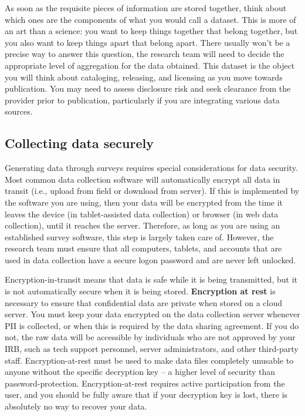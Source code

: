 As soon as the requisite pieces of information are stored together,
think about which ones are the components of what you would call a dataset.
This is more of an art than a science:
you want to keep things together that belong together,
but you also want to keep things apart that belong apart.
There usually won't be a precise way to answer this question,
the research team will need to decide the appropriate level of aggregation
for the data obtained.
This dataset is the object you will think about cataloging, releasing, and licensing
as you move towards publication.
You may need to assess disclosure risk and seek clearance from the provider prior to publication,
particularly if you are integrating various data sources.

\subsection{Collecting data securely}
Generating data through surveys requires special considerations for data security.
Most common data collection software will automatically encrypt
all data in transit (i.e., upload from field or download from server).
If this is implemented by the software you are using,
then your data will be encrypted from the time it leaves the device
(in tablet-assisted data collection) or browser (in web data collection),
until it reaches the server.
Therefore, as long as you are using an established survey software,
this step is largely taken care of.
However, the research team must ensure that all computers, tablets,
and accounts that are used in data collection have a secure logon
password and are never left unlocked.

Encryption-in-transit means that data is safe while it is being transmitted,
but it is not automatically secure when it is being stored.
\textbf{Encryption at rest}
is necessary to ensure that confidential data are private when stored on a cloud server.
You must keep your data encrypted on the data collection server whenever PII is collected,
or when this is required by the data sharing agreement.
If you do not, the raw data will be accessible by
individuals who are not approved by your IRB,
such as tech support personnel,
server administrators, and other third-party staff.
Encryption-at-rest must be used to make
data files completely unusable to anyone without the specific decryption key 
-- a higher level of security than password-protection.
Encryption-at-rest requires active participation from the user,
and you should be fully aware that if your decryption key is lost,
there is absolutely no way to recover your data.

